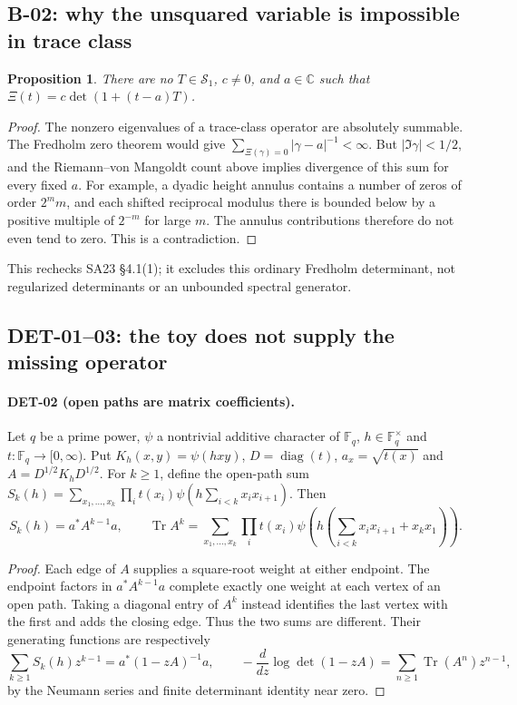 \documentclass[11pt,a4paper]{article}
\newcommand{\Tr}{\operatorname{Tr}}
\newcommand{\diag}{\operatorname{diag}}
\newcommand{\Sone}{\mathcal S_1}
\newcommand{\C}{\mathbb C}
\newcommand{\F}{\mathbb F}
\newtheorem*{proposition}{Proposition}
\begin{document}
\subsection{B-02: why the unsquared variable is impossible in trace class}
\begin{proposition}
There are no $T\in\Sone$, $c\ne0$, and $a\in\C$ such that
$\Xi(t)=c\det(1+(t-a)T)$.
\end{proposition}
\begin{proof}
The nonzero eigenvalues of a trace-class operator are absolutely summable. The Fredholm zero theorem would give
$\sum_{\Xi(\gamma)=0}|\gamma-a|^{-1}<\infty$.
But $|\Im\gamma|<1/2$, and the Riemann--von Mangoldt count above implies divergence of this sum for every fixed $a$. For example, a dyadic height annulus contains a number of zeros of order $2^m m$, and each shifted reciprocal modulus there is bounded below by a positive multiple of $2^{-m}$ for large $m$. The annulus contributions therefore do not even tend to zero. This is a contradiction.
\end{proof}
This rechecks SA23 \S4.1(1); it excludes this ordinary Fredholm determinant, not regularized determinants or an unbounded spectral generator.

\subsection{DET-01--03: the toy does not supply the missing operator}
\paragraph{DET-02 (open paths are matrix coefficients).}
Let $q$ be a prime power, $\psi$ a nontrivial additive character of $\F_q$, $h\in\F_q^\times$ and $t:\F_q\to[0,\infty)$. Put $K_h(x,y)=\psi(hxy)$, $D=\diag(t)$, $a_x=\sqrt{t(x)}$ and $A=D^{1/2}K_hD^{1/2}$. For $k\ge1$, define the open-path sum
$S_k(h)=\sum_{x_1,\ldots,x_k}\prod_i t(x_i)\psi(h\sum_{i<k}x_ix_{i+1})$. Then
\begin{equation}\label{eq:pathcycle}
 S_k(h)=a^*A^{k-1}a,
 \qquad
 \Tr A^k=\sum_{x_1,\ldots,x_k}\prod_i t(x_i)
 \psi\!\left(h\left(\sum_{i<k}x_ix_{i+1}+x_kx_1\right)\right).
\end{equation}
\begin{proof}
Each edge of $A$ supplies a square-root weight at either endpoint. The endpoint factors in $a^*A^{k-1}a$ complete exactly one weight at each vertex of an open path. Taking a diagonal entry of $A^k$ instead identifies the last vertex with the first and adds the closing edge. Thus the two sums are different. Their generating functions are respectively
\[
 \sum_{k\ge1}S_k(h)z^{k-1}=a^*(1-zA)^{-1}a,
 \qquad
 -\frac{d}{dz}\log\det(1-zA)=\sum_{n\ge1}\Tr(A^n)z^{n-1},
\]
by the Neumann series and finite determinant identity near zero.
\end{proof}
\end{document}
